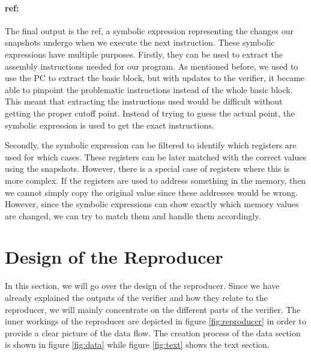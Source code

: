 \paragraph{ref:}
The final output is the ref, a symbolic expression representing the changes our snapshots undergo when we execute the next instruction.
These symbolic expressions have multiple purposes.
Firstly, they can be used to extract the assembly instructions needed for our program.
As mentioned before, we used to use the PC to extract the basic block, but with updates to the verifier, it became able to pinpoint the problematic instructions instead of the whole basic block.
This meant that extracting the instructions used would be difficult without getting the proper cutoff point.
Instead of trying to guess the actual point, the symbolic expression is used to get the exact instructions.

Secondly, the symbolic expression can be filtered to identify which registers are used for which cases.
These registers can be later matched with the correct values using the snapshots.
However, there is a special case of registers where this is more complex.
If the registers are used to address something in the memory, then we cannot simply copy the original value since these addresses would be wrong.
However, since the symbolic expressions can show exactly which memory values are changed, we can try to match them and handle them accordingly.

\section{Design of the Reproducer}
In this section, we will go over the design of the reproducer.
Since we have already explained the outputs of the verifier and how they relate to the reproducer, we will mainly concentrate on the different parts of the verifier.
The inner workings of the reproducer are depicted in figure \ref{fig:reproducer} in order to provide a clear picture of the data flow.
The creation process of the data section is shown in figure \ref{fig:data} while figure \ref{fig:text} shows the text section.

